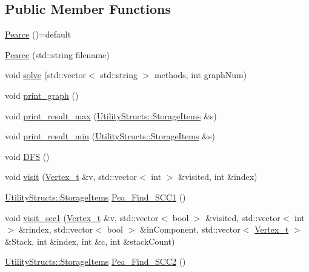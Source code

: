 \subsection*{Public Member Functions}
\begin{DoxyCompactItemize}
\item 
\hyperlink{class_pearce_a4ad24a40c64e8f3481dd0dbbcb8d2bcb}{Pearce} ()=default
\item 
\hyperlink{class_pearce_a0851b1b696528448c1a42dbb6b4e6c8f}{Pearce} (std\+::string filename)
\item 
void \hyperlink{class_pearce_a7c6ea7dde3dc3e127e4fc6ad1892974e}{solve} (std\+::vector$<$ std\+::string $>$ methods, int graph\+Num)
\item 
void \hyperlink{class_pearce_a96ed7e50d992838177699b6133464554}{print\+\_\+graph} ()
\item 
void \hyperlink{class_pearce_aaa906779c670a16948c00a9c031e6986}{print\+\_\+result\+\_\+max} (\hyperlink{struct_utility_structs_1_1_storage_items}{Utility\+Structs\+::\+Storage\+Items} \&s)
\item 
void \hyperlink{class_pearce_af2a6f31643617305794c06b5d2c85ebe}{print\+\_\+result\+\_\+min} (\hyperlink{struct_utility_structs_1_1_storage_items}{Utility\+Structs\+::\+Storage\+Items} \&s)
\item 
void \hyperlink{class_pearce_ad50f62a493ed2b5eb7fcb3c0f8e2e079}{D\+FS} ()
\item 
void \hyperlink{class_pearce_ac5e668d0d21ee0dad33cea171b9e2022}{visit} (\hyperlink{class_graph_component_ae67114a6ce5a001dc35e1996e1b45aa0}{Vertex\+\_\+t} \&v, std\+::vector$<$ int $>$ \&visited, int \&index)
\item 
\hyperlink{struct_utility_structs_1_1_storage_items}{Utility\+Structs\+::\+Storage\+Items} \hyperlink{class_pearce_a4a78c1ec037146537f575fa62b1e0265}{Pea\+\_\+\+Find\+\_\+\+S\+C\+C1} ()
\item 
void \hyperlink{class_pearce_ae4e9364dd0c829564ecfbfe8ccc07b6a}{visit\+\_\+scc1} (\hyperlink{class_graph_component_ae67114a6ce5a001dc35e1996e1b45aa0}{Vertex\+\_\+t} \&v, std\+::vector$<$ bool $>$ \&visited, std\+::vector$<$ int $>$ \&rindex, std\+::vector$<$ bool $>$ \&in\+Component, std\+::vector$<$ \hyperlink{class_graph_component_ae67114a6ce5a001dc35e1996e1b45aa0}{Vertex\+\_\+t} $>$ \&Stack, int \&index, int \&c, int \&stack\+Count)
\item 
\hyperlink{struct_utility_structs_1_1_storage_items}{Utility\+Structs\+::\+Storage\+Items} \hyperlink{class_pearce_a4764238b69ee587134a9009619a4cae5}{Pea\+\_\+\+Find\+\_\+\+S\+C\+C2} ()

\end{DoxyCompactItemize}
